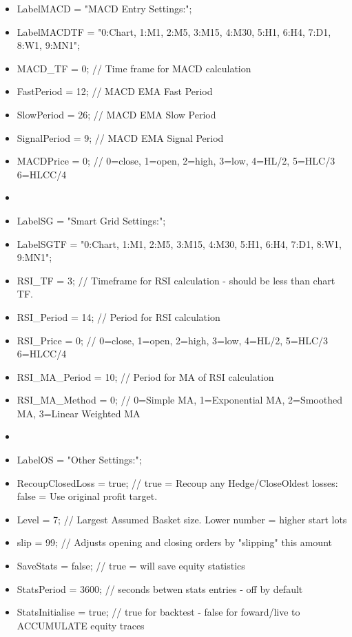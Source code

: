 \begin{itemize}
\item LabelMACD           = "MACD Entry Settings:";
\item LabelMACDTF         = "0:Chart, 1:M1, 2:M5, 3:M15, 4:M30, 5:H1, 6:H4, 7:D1, 8:W1, 9:MN1";
\item MACD\_TF             = 0;        // Time frame for MACD calculation
\item FastPeriod          = 12;       // MACD EMA Fast Period
\item SlowPeriod          = 26;       // MACD EMA Slow Period
\item SignalPeriod        = 9;        // MACD EMA Signal Period
\item MACDPrice           = 0;        // 0=close, 1=open, 2=high, 3=low, 4=HL/2, 5=HLC/3 6=HLCC/4
\item 
\item LabelSG             = "Smart Grid Settings:";
\item LabelSGTF           = "0:Chart, 1:M1, 2:M5, 3:M15, 4:M30, 5:H1, 6:H4, 7:D1, 8:W1, 9:MN1";
\item RSI\_TF              = 3;        // Timeframe for RSI calculation - should be less than chart TF.
\item RSI\_Period          = 14;       // Period for RSI calculation
\item RSI\_Price           = 0;        // 0=close, 1=open, 2=high, 3=low, 4=HL/2, 5=HLC/3 6=HLCC/4
\item RSI\_MA\_Period       = 10;       // Period for MA of RSI calculation
\item RSI\_MA\_Method       = 0;        // 0=Simple MA, 1=Exponential MA, 2=Smoothed MA, 3=Linear Weighted MA
\item 
\item LabelOS             = "Other Settings:";
\item RecoupClosedLoss    = true;     // true = Recoup any Hedge/CloseOldest losses: false = Use original profit target.
\item Level               = 7;        // Largest Assumed Basket size.  Lower number = higher start lots
\item slip                = 99;       // Adjusts opening and closing orders by "slipping" this amount
\item SaveStats           = false;    // true = will save equity statistics
\item StatsPeriod         = 3600;     // seconds betwen stats entries - off by default
\item StatsInitialise     = true;     // true for backtest - false for foward/live to ACCUMULATE equity traces

\end{itemize}
